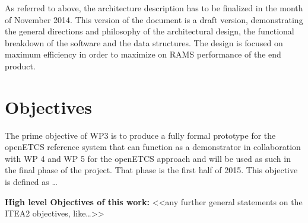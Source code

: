 As referred to above, the architecture description has to be finalized in the month of November 2014. This version of the document is a draft version, demonstrating the general directions and philosophy of the architectural design, the functional breakdown of the software and the data structures. The design is focused on maximum efficiency in order to maximize on RAMS performance of the end product.\\


\section{Objectives}
The prime objective of WP3 is to produce a fully formal prototype for the openETCS reference system that can function as a demonstrator in collaboration with WP 4 and WP 5  for the openETCS approach and will be used as such in the final phase of the project. That phase is the first half of 2015.  This objective is defined as … 

\textbf{High level Objectives of this work:}
<<any further general statements on the ITEA2  objectives, like…>>\\

